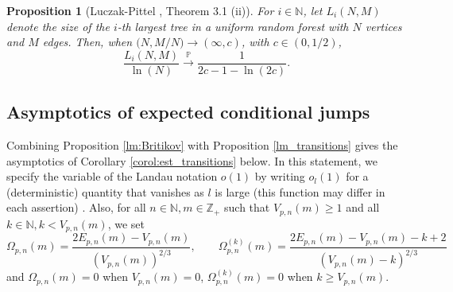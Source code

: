 \documentclass[a4, 11pt]{article}
\numberwithin{equation}{section}
\theoremstyle{plain}
\newtheorem{proposition}[theorem]{Proposition}
\theoremstyle{definition}
\theoremstyle{remark}
\begin{document}
\begin{proposition}[Luczak-Pittel \cite{LuczakPittel92}, Theorem 3.1 (ii)]
\label{prop:largest_trees}
For $i\in \mathbb N$, let $L_i(N,M)$ denote the size of the $i$-th largest tree in a uniform random forest with $N$ vertices and $M$ edges. Then, when $\big(N,M/N\big) \rightarrow (\infty,c)$, with $c \in (0,1/2)$,
$$
\frac{L_i(N,M)}{\ln(N)} \overset{\mathbb P}\longrightarrow \frac{1}{2c-1-\ln(2c)}.
$$
\end{proposition}




\subsection{Asymptotics of expected conditional jumps}
\label{sec:asymp_conditioned}

Combining Proposition \ref{lm:Britikov} with Proposition \ref{lm_transitions} gives the asymptotics of Corollary \ref{corol:est_transitions} below. In this statement, we specify the variable of the Landau notation $o(1)$ by writing $o_l(1)$ for a (deterministic) quantity that vanishes as $l$ is large (this function may differ in each assertion) . 
Also, for all $n \in \mathbb N, m \in \mathbb Z_+$ such that $V_{p,n}(m)\geq 1$ and all $k \in \mathbb N, k <V_{p,n}(m)$, we set 
$$\Omega_{p,n}(m)=\frac{2E_{p,n}(m)-V_{p,n}(m)}{(V_{p,n}(m))^{2/3}}, \qquad \Omega_{p,n}^{(k)}(m)=\frac{2E_{p,n}(m)-V_{p,n}(m)-k+2}{\left(V_{p,n}(m)-k\right)^{2/3}}$$
and $\Omega_{p,n}(m)=0$ when $V_{p,n}(m)=0$, $\Omega_{p,n}^{(k)}(m)=0$ when $k \geq V_{p,n}(m)$.
\end{document}
